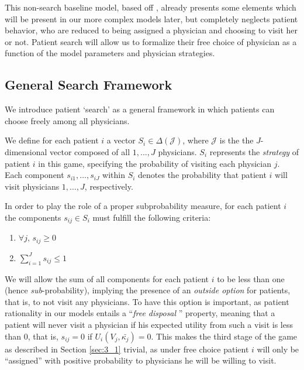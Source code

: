 \documentclass[../main.tex]{subfiles}
\begin{document}
This non-search baseline model, based off \cite{schnell2017physician}, already presents some elements which will be present in our more complex models later, but completely neglects patient behavior, who are reduced to being assigned a physician and choosing to visit her or not. Patient search will allow us to formalize their free choice of physician as a function of the model parameters and physician strategies.


\subsection{General Search Framework}

We introduce patient `search' as a general framework in which patients can choose freely among all physicians.

We define for each patient $i$ a vector $S_i \in \Delta(\mathcal{J})$, where $\mathcal{J}$ is the the $J$-dimensional vector composed of all $1, ..., J$ physicians. $S_i$ represents the \textit{strategy} of patient \( i \) in this game, specifying the probability of visiting each physician \( j \). Each component \( s_{i1}, \ldots, s_{iJ} \) within \( S_i \) denotes the probability that patient \( i \) will visit physicians \( 1, \ldots, J \), respectively.


In order to play the role of a proper subprobability measure, for each patient $i$ the components $s_{ij} \in S_i$ must fulfill the following criteria:
\begin{enumerate}[label=\roman*.]
    \item $\forall j, \, s_{ij} \geq 0$
    \item $\sum_{i = 1}^{J} s_{ij} \leq 1$
\end{enumerate}

We will allow the sum of all components for each patient $i$ to be less than one (hence \textit{sub}-probability), implying the presence of an \textit{outside option} for patients, that is, to not visit any physicians. To have this option is important, as patient rationality in our models entails a  ``\textit{free disposal }'' property, meaning that a patient will never visit a physician if his expected utility from such a visit is less than $0$, that is, $s_{ij} = 0$ if $U_i(V_j,\bar{\kappa_j}) = 0$. This makes the third stage of the game as described in Section \ref{sec:3_1} trivial, as under free choice patient $i$ will only be ``assigned'' with positive probability to physicians he will be willing to visit.
\end{document}
